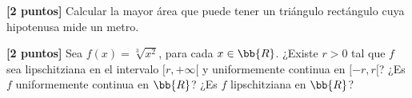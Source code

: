 \documentclass[12pt]{article}
\begin{document}
\begin{ejercicio}\textbf{[2 puntos]} Calcular la mayor área que puede tener un triángulo rectángulo cuya hipotenusa mide un metro.
    
\end{ejercicio}

\begin{ejercicio}\textbf{[2 puntos]}
    Sea $f(x)=\sqrt[3]{x^2}$, para cada $x\in \bb{R}$. ¿Existe $r>0$ tal que $f$ sea lipschitziana en el intervalo $[r, +\infty[$ y uniformemente continua en $[-r, r[$? ¿Es $f$ uniformemente continua en $\bb{R}$? ¿Es $f$ lipschitziana en $\bb{R}$?
\end{ejercicio}
\end{document}

